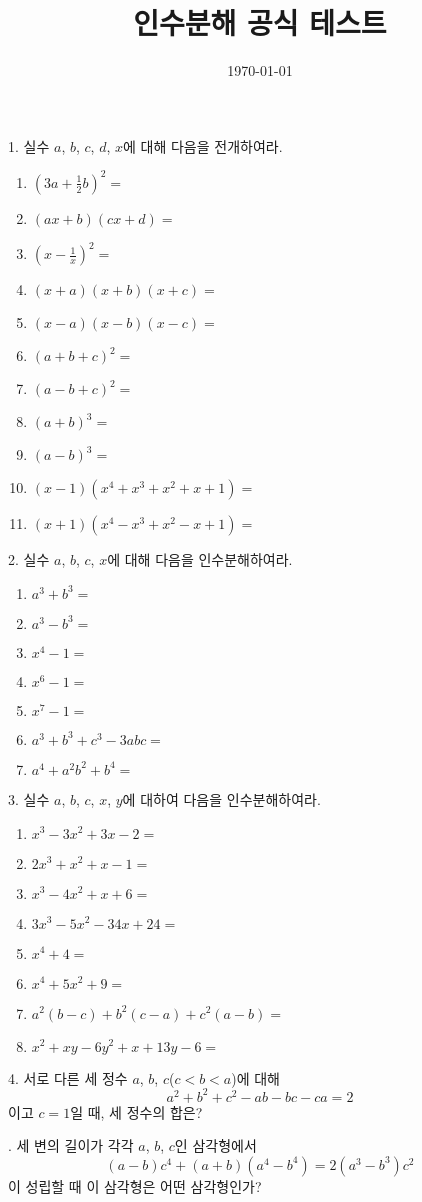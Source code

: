 \documentclass{article}
\begin{document}
\title{인수분해 공식 테스트}
\author{}
\date{\today}
\maketitle


%
1.
실수 \(a\), \(b\), \(c\), \(d\), \(x\)에 대해 다음을 전개하여라.
\begin{enumerate}[(1)]
\item
\((3a+\frac12b)^2=\)
\item
\((ax+b)(cx+d)=\)
\item
\((x-\frac1x)^2=\)
\item
\((x+a)(x+b)(x+c)=\)
\item
\((x-a)(x-b)(x-c)=\)
\item
\((a+b+c)^2=\)
\item
\((a-b+c)^2=\)
\item
\((a+b)^3=\)
\item
\((a-b)^3=\)
\item
\((x-1)(x^4+x^3+x^2+x+1)=\)
\item
\((x+1)(x^4-x^3+x^2-x+1)=\)
\end{enumerate}

2.
실수 \(a\), \(b\), \(c\), \(x\)에 대해 다음을 인수분해하여라.
\begin{enumerate}[(1)]
\item
\(a^3+b^3=\)
\item
\(a^3-b^3=\)
\item
\(x^4-1=\)
\item
\(x^6-1=\)
\item
\(x^7-1=\)
\item
\(a^3+b^3+c^3-3abc=\)
\item
\(a^4+a^2b^2+b^4=\)
\end{enumerate}

3.
실수 \(a\), \(b\), \(c\), \(x\), \(y\)에 대하여 다음을 인수분해하여라.
\begin{enumerate}[(1)]
\item
\(x^3-3x^2+3x-2=\)
\item
\(2x^3+x^2+x-1=\)
\item
\(x^3-4x^2+x+6=\)
\item
\(3x^3-5x^2-34x+24=\)
\item
\(x^4+4=\)
\item
\(x^4+5x^2+9=\)
\item
\(a^2(b-c)+b^2(c-a)+c^2(a-b)=\)
\item
\(x^2+xy-6y^2+x+13y-6=\)
\end{enumerate}

4.
서로 다른 세 정수 \(a\), \(b\), \(c\)(\(c<b<a\))에 대해
\[a^2+b^2+c^2-ab-bc-ca=2\]
이고 \(c=1\)일 때, 세 정수의 합은?

.
세 변의 길이가 각각 \(a\), \(b\), \(c\)인 삼각형에서
\[(a-b)c^4+(a+b)(a^4-b^4)=2(a^3-b^3)c^2\]
이 성립할 때 이 삼각형은 어떤 삼각형인가?
\end{document}
